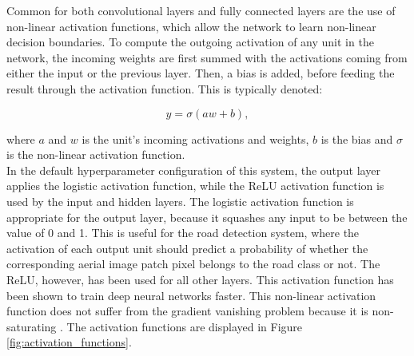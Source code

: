 Common for both convolutional layers and fully connected layers are the use of non-linear activation functions, which allow the network to learn non-linear decision boundaries. To compute the outgoing activation of any unit in the network, the incoming weights are first summed with the activations coming from either the input or the previous layer. Then, a bias is added, before feeding the result through the activation function. This is typically denoted:

$$ y = \sigma(aw + b),$$

\noindent where $a$ and  $w$ is  the unit's incoming activations and weights, $b$ is the bias and $\sigma$ is the non-linear activation function.\\

In the default hyperparameter configuration of this system, the output layer applies the logistic activation function, while the \ac{ReLU} activation function is used by the input and hidden layers. The logistic activation function is appropriate for the output layer, because it squashes any input to be between the value of 0 and 1. This is useful for the road detection system, where the activation of each output unit should predict a probability of whether the corresponding aerial image patch pixel belongs to the road class or not. The \ac{ReLU}, however, has been used for all other layers. This activation function has been shown to train deep neural networks faster. This non-linear activation function does not suffer from the gradient vanishing problem because it is non-saturating \citep{Krizhevsky_imagenet}. The activation functions are displayed in Figure \ref{fig:activation_functions}.\\

